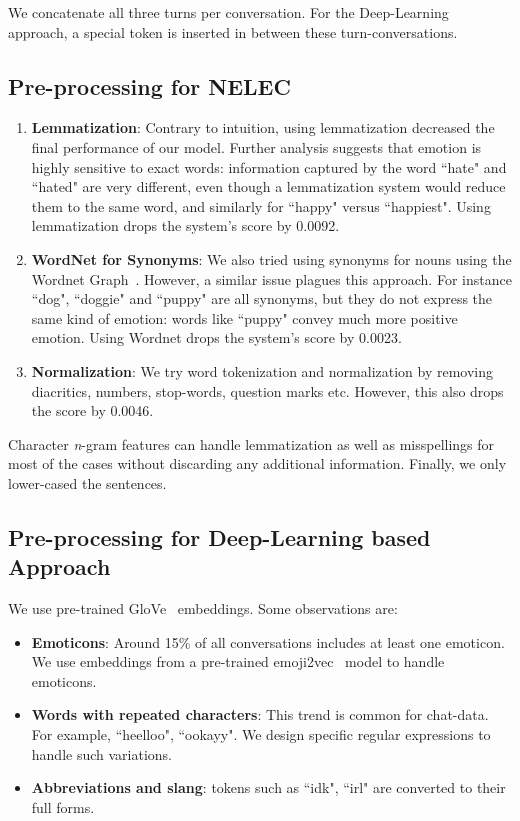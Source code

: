 \documentclass[11pt,a4paper]{article}
\begin{document}
We concatenate all three turns per conversation. For the Deep-Learning approach, a special  token is inserted in between these turn-conversations.

\subsection{Pre-processing for NELEC} \label{lexical_preprocess}

\begin{enumerate}
    \item \textbf{Lemmatization}: Contrary to intuition, using lemmatization decreased the final performance of our model. Further analysis suggests that emotion is highly sensitive to exact words: information captured by the word ``hate" and ``hated" are very different, even though a lemmatization system would reduce them to the same word, and similarly for ``happy" versus ``happiest". Using lemmatization drops the system's  score by 0.0092.
    \item \textbf{WordNet for Synonyms}: We also tried using synonyms for nouns using the Wordnet Graph~\cite{miller1998wordnet}. However, a similar issue plagues this approach. For instance ``dog", ``doggie" and ``puppy" are all synonyms, but they do not express the same kind of emotion: words like ``puppy" convey much more positive emotion. Using Wordnet drops the system's  score by 0.0023. 
    \item \textbf{Normalization}: We try word tokenization and normalization by removing diacritics, numbers, stop-words, question marks etc.  However, this also drops the  score by 0.0046.
\end{enumerate}

Character \textit{n}-gram features can handle lemmatization as well as misspellings for most of the cases without discarding any additional information. Finally, we only lower-cased the sentences.

\subsection{Pre-processing for Deep-Learning based Approach} \label{deep_preprocess}
We use pre-trained GloVe~\cite{pennington2014glove} embeddings. Some observations are:
\begin{itemize}
    \item \textbf{Emoticons}: Around 15\% of all conversations includes at least one emoticon. We use embeddings from a pre-trained emoji2vec~\cite{eisner2016emoji2vec} model to handle emoticons.
    \item \textbf{Words with repeated characters}:  This trend is common for chat-data. For example, ``heelloo", ``ookayy". We design specific regular expressions to handle such variations.
    \item \textbf{Abbreviations and slang}: tokens such as ``idk", ``irl" are converted to their full forms.
\end{itemize}
\end{document}
